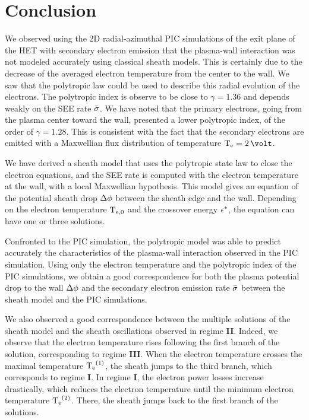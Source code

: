 

\section{Conclusion} \label{subsec-concuslion_ch4}

We observed using the \ac{2D} radial-azimuthal \ac{PIC} simulations of the exit plane of the \ac{HET} with secondary electron emission that the plasma-wall interaction was not modeled accurately using classical sheath models.
This is certainly due to the decrease of the averaged electron temperature from the center to the wall.
We saw that the polytropic law could be used to describe this radial evolution of the electrons.
The polytropic index is observe to be close to $\gamma=1.36$ and depends weakly on the \ac{SEE} rate $ \bar{\sigma }$.
We have noted that the primary electrons, going from the plasma center toward the wall, presented a lower polytropic index, of the order of $\gamma=1.28$.
This is consistent with the fact that the secondary electrons are emitted with a Maxwellian flux distribution of temperature $\Te=2\,\volt$.

We have derived a sheath model that uses the polytropic state law to close the electron equations, and the \ac{SEE} rate is computed with the electron temperature at the wall, with a local Maxwellian hypothesis.
This model gives an equation of the potential sheath drop $\Delta \phi$ between the sheath edge and the wall.
Depending on the electron temperature $\mathrm{T_{e, 0}}$ and the crossover energy $\epsilon^{*}$, the equation can have one or three solutions.

Confronted to the \ac{PIC} simulation, the polytropic model was able to predict accurately the characteristics of the plasma-wall interaction observed in the \ac{PIC} simulation.
Using only the electron temperature and the polytropic index of the \ac{PIC} simulations, we obtain a good correspondence for both the plasma potential drop to the wall $\Delta \phi$ and the secondary electron emission rate $ \bar{\sigma }$ between the sheath model and the \ac{PIC} simulations.

We also observed a good correspondence between the multiple solutions of the sheath model and the sheath oscillations observed in regime {\bf II}.
Indeed, we observe that the electron temperature rises following the first branch of the solution, corresponding to regime {\bf III}.
When the electron temperature crosses the maximal temperature $\mathrm{T_e}^{(1)}$, the sheath jumps to the third branch, which corresponds to regime {\bf I}.
In regime {\bf I}, the electron power losses increase drastically, which reduces the electron temperature until the minimum electron temperature $\mathrm{T_e}^{(2)}$.
There, the sheath jumps back to the first branch of the solutions.


